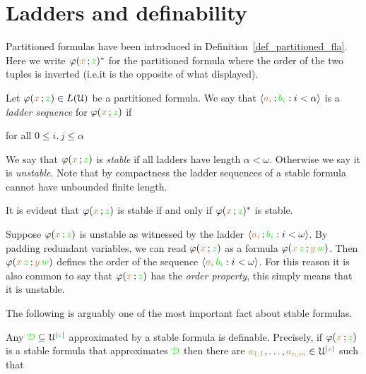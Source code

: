 \documentclass[creche.tex]{subfiles}
\begin{document}
\section{Ladders and definability}

Partitioned formulas have been introduced in Definition~\ref{def_partitioned_fla}. Here we write \emph{$\varphi({\color{brown} x}\,;{\color{green} z})^*$\/} for the partitioned formula where the order of the two tuples is inverted (i.e.\@ it is the opposite of what displayed).

Let $\varphi({\color{brown} x}\,;{\color{green} z})\in L(\EuScript U)$ be a partitioned formula. We say that $\langle{\color{brown}a_i}\,;{\color{green} b_i} : i<\alpha\rangle$ is a \emph{ladder sequence\/} for $\varphi({\color{brown} x}\,;{\color{green} z})$ if 

\hfill for all $0\le i,j\le\alpha$

We say that $\varphi({\color{brown} x}\,;{\color{green} z})$ is \emph{stable\/} if all ladders have length $\alpha<\omega$. Otherwise we say it is \emph{unstable}. Note that by compactness the ladder sequences of a stable formula cannot have unbounded finite length. 

It is evident that $\varphi({\color{brown} x}\,;{\color{green} z})$ is stable if and only if $\varphi({\color{brown} x}\,;{\color{green} z})^*$ is stable.

Suppose $\varphi({\color{brown} x}\,;{\color{green} z})$ is unstable as witnessed by the ladder $\langle{\color{brown}a_i}\,;{\color{green} b_i} : i<\omega\rangle$. By padding redundant variables, we can read $\varphi({\color{brown} x}\,;{\color{green} z})$ as a formula $\varphi({\color{brown} x}\,{\color{green} z}\,;{\color{brown} y}\,{\color{green} w})$. Then $\varphi({\color{brown} x}\,{\color{green} z}\,;{\color{brown} y}\,{\color{green} w})$ defines the order of the sequence $\langle{\color{brown}a_i}\,{\color{green} b_i} : i<\omega\rangle$. For this reason it is also common to say that $\varphi({\color{brown} x}\,;{\color{green} z})$ has the \emph{order property}, this simply means that it is unstable. 

The following is arguably one of the most important fact about stable formulas.

\begin{theorem}\label{thm_def_stable_formula}
Any ${\color{green}\EuScript D}\subseteq\EuScript U^{|{\color{green} z}|}$ approximated by a stable formula is definable.
Precisely, if $\varphi({\color{brown} x}\,;{\color{green} z})$ is a stable formula that approximates ${\color{green}\EuScript D}$ then there are ${\color{brown} a_{1,1}},\dots,{\color{brown} a_{n,m}}\in\EuScript U^{|{\color{brown} x}|}$ such that 

\end{theorem}
\end{document}
